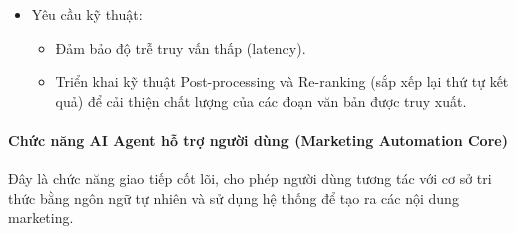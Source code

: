 \begin{itemize}
\item
  Yêu cầu kỹ thuật:

  \begin{itemize}
  \item
    Đảm bảo độ trễ truy vấn thấp (latency).
  \item
    Triển khai kỹ thuật Post-processing và Re-ranking (sắp xếp lại thứ
    tự kết quả) để cải thiện chất lượng của các đoạn văn bản được truy
    xuất.
  \end{itemize}
\end{itemize}

\paragraph{Chức năng AI Agent hỗ trợ người dùng (Marketing Automation
Core)}\label{chux1ee9c-nux103ng-ai-agent-hux1ed7-trux1ee3-ngux1b0ux1eddi-duxf9ng-marketing-automation-core}

Đây là chức năng giao tiếp cốt lõi, cho phép người dùng tương tác với cơ
sở tri thức bằng ngôn ngữ tự nhiên và sử dụng hệ thống để tạo ra các nội
dung marketing.

